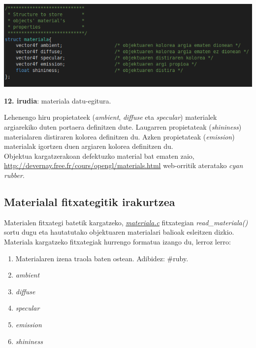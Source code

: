 \documentclass[12pt]{article}
\newcommand{\fitxategi}[1] {\underline{\textit{#1}}}
\newcommand{\metodo}[1] {\textit{#1}}
\newcommand{\aldagai}[1] {\textit{#1}}
\begin{document}
\begin{center}
\includegraphics[scale=1.8]{materiala.png}

\textbf{12. irudia}: materiala datu-egitura.
\end{center}

Lehenengo hiru propietateek (\aldagai{ambient}, \aldagai{diffuse} eta \aldagai{specular}) materialek argiarekiko duten portaera definitzen dute. Laugarren propietateak (\aldagai{shininess}) materialaren distiraren kolorea definitzen du. Azken propietateak (\aldagai{emission}) materialak igortzen duen argiaren kolorea definitzen du.\\

Objektua kargatzerakoan defektuzko material bat ematen zaio, \url{http://devernay.free.fr/cours/opengl/materials.html} web-orritik ateratako \textit{cyan rubber}.

\subsection{Materialal fitxategitik irakurtzea}

Materialen fitxategi batetik kargatzeko, \fitxategi{materiala.c} fitxategian \metodo{read\_materiala()} sortu dugu eta hautatutako objektuaren materialari balioak esleitzen dizkio.\\

Materiala kargatzeko fitxategiak hurrengo formatua izango du, lerroz lerro:
\begin{enumerate}

\item Materialaren izena traola baten ostean. Adibidez: \#ruby.

\item \aldagai{ambient}

\item \aldagai{diffuse}

\item \aldagai{specular}

\item \aldagai{emission}

\item \aldagai{shininess}

\end{enumerate}
\end{document}
